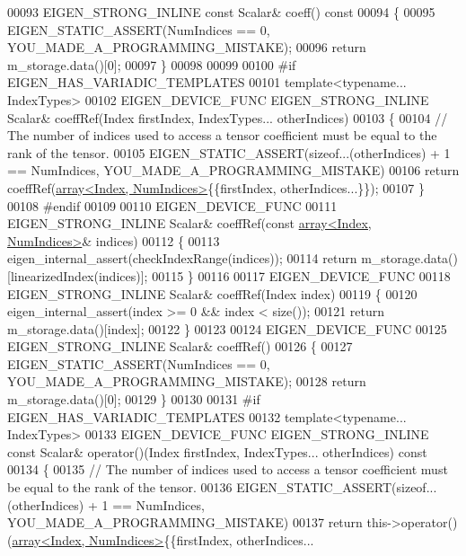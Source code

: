 \begin{DoxyCode}
00093     EIGEN\_STRONG\_INLINE \textcolor{keyword}{const} Scalar& coeff()\textcolor{keyword}{ const}
00094 \textcolor{keyword}{    }\{
00095       EIGEN\_STATIC\_ASSERT(NumIndices == 0, YOU\_MADE\_A\_PROGRAMMING\_MISTAKE);
00096       \textcolor{keywordflow}{return} m\_storage.data()[0];
00097     \}
00098 
00099 
00100 \textcolor{preprocessor}{#if EIGEN\_HAS\_VARIADIC\_TEMPLATES}
00101     \textcolor{keyword}{template}<\textcolor{keyword}{typename}... IndexTypes>
00102     EIGEN\_DEVICE\_FUNC EIGEN\_STRONG\_INLINE Scalar& coeffRef(Index firstIndex, IndexTypes... otherIndices)
00103     \{
00104       \textcolor{comment}{// The number of indices used to access a tensor coefficient must be equal to the rank of the tensor.}
00105       EIGEN\_STATIC\_ASSERT(\textcolor{keyword}{sizeof}...(otherIndices) + 1 == NumIndices, YOU\_MADE\_A\_PROGRAMMING\_MISTAKE)
00106       \textcolor{keywordflow}{return} coeffRef(\hyperlink{class_eigen_1_1array}{array<Index, NumIndices>}\{\{firstIndex, otherIndices...\}\});
00107     \}
00108 \textcolor{preprocessor}{#endif}
00109 
00110     EIGEN\_DEVICE\_FUNC
00111     EIGEN\_STRONG\_INLINE Scalar& coeffRef(\textcolor{keyword}{const} \hyperlink{class_eigen_1_1array}{array<Index, NumIndices>}& indices)
00112     \{
00113       eigen\_internal\_assert(checkIndexRange(indices));
00114       \textcolor{keywordflow}{return} m\_storage.data()[linearizedIndex(indices)];
00115     \}
00116 
00117     EIGEN\_DEVICE\_FUNC
00118     EIGEN\_STRONG\_INLINE Scalar& coeffRef(Index index)
00119     \{
00120       eigen\_internal\_assert(index >= 0 && index < size());
00121       \textcolor{keywordflow}{return} m\_storage.data()[index];
00122     \}
00123 
00124     EIGEN\_DEVICE\_FUNC
00125     EIGEN\_STRONG\_INLINE Scalar& coeffRef()
00126     \{
00127       EIGEN\_STATIC\_ASSERT(NumIndices == 0, YOU\_MADE\_A\_PROGRAMMING\_MISTAKE);
00128       \textcolor{keywordflow}{return} m\_storage.data()[0];
00129     \}
00130 
00131 \textcolor{preprocessor}{#if EIGEN\_HAS\_VARIADIC\_TEMPLATES}
00132     \textcolor{keyword}{template}<\textcolor{keyword}{typename}... IndexTypes>
00133     EIGEN\_DEVICE\_FUNC EIGEN\_STRONG\_INLINE \textcolor{keyword}{const} Scalar& operator()(Index firstIndex, IndexTypes... 
      otherIndices)\textcolor{keyword}{ const}
00134 \textcolor{keyword}{    }\{
00135       \textcolor{comment}{// The number of indices used to access a tensor coefficient must be equal to the rank of the tensor.}
00136       EIGEN\_STATIC\_ASSERT(\textcolor{keyword}{sizeof}...(otherIndices) + 1 == NumIndices, YOU\_MADE\_A\_PROGRAMMING\_MISTAKE)
00137       \textcolor{keywordflow}{return} this->operator()(\hyperlink{class_eigen_1_1array}{array<Index, NumIndices>}\{\{firstIndex, otherIndices...

\end{DoxyCode}
